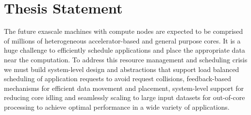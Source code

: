 \section{Thesis Statement}
\label{thesis}
The future exascale machines with compute nodes are expected to be comprised of millions of heterogeneous accelerator-based and general purpose cores. It is a huge challenge to efficiently schedule applications and place the appropriate data near the computation. To address this resource management and scheduling crisis we must build system-level design and abstractions that support load balanced scheduling of application requests to avoid request collisions, feedback-based mechanisms for efficient data movement and placement, system-level support for reducing core idling and seamlessly scaling to large input datasets for out-of-core processing to achieve optimal performance in a wide variety of applications.   

